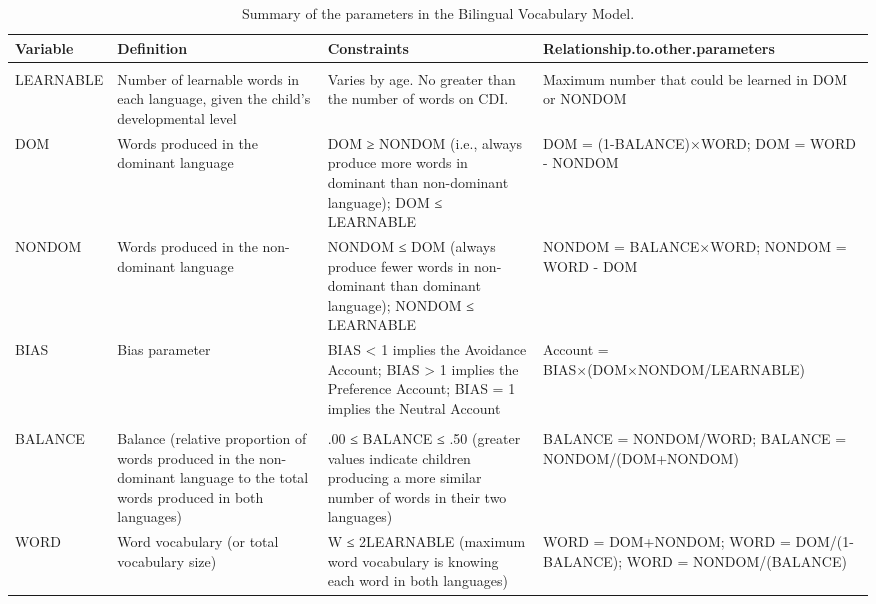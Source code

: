 \documentclass[
  english,
  ,man,floatsintext]{apa6}
\begin{document}
\begin{landscape}\begin{table}

\caption{\label{tab:table1}Summary of the parameters in the Bilingual Vocabulary Model.}
\centering
\fontsize{7}{9}\selectfont
\begin{tabular}[t]{l>{\raggedright\arraybackslash}p{175px}>{\raggedright\arraybackslash}p{175px}>{\raggedright\arraybackslash}p{175px}}
\toprule
Variable & Definition & Constraints & Relationship.to.other.parameters\\
\midrule
\addlinespace[0.3em]
\multicolumn{4}{l}{\textbf{Main Parameters}}\\
\hspace{1em}LEARNABLE & Number of learnable words in each language, given the child’s developmental level & Varies by age. No greater than the number of words on CDI. & Maximum number that could be learned in DOM or NONDOM\\
\hspace{1em}DOM & Words produced in the dominant language & DOM ≥ NONDOM (i.e., always produce more words in dominant than non-dominant language); DOM ≤ LEARNABLE & DOM = (1-BALANCE)×WORD; DOM = WORD - NONDOM\\
\hspace{1em}NONDOM & Words produced in the non-dominant language & NONDOM ≤ DOM (always produce fewer words in non-dominant than dominant language); NONDOM ≤ LEARNABLE & NONDOM = BALANCE×WORD; NONDOM = WORD - DOM\\
\hspace{1em}BIAS & Bias parameter & BIAS < 1 implies the Avoidance Account; BIAS > 1 implies the Preference Account; BIAS = 1 implies the Neutral Account & Account = BIAS×(DOM×NONDOM/LEARNABLE)\\
\addlinespace[0.3em]
\multicolumn{4}{l}{\textbf{Derived Parameters}}\\
\hspace{1em}BALANCE & Balance (relative proportion of words produced in the non-dominant language to the total words produced in both languages) & .00 ≤ BALANCE ≤ .50 (greater values indicate children producing a more similar number of words in their two languages) & BALANCE = NONDOM/WORD; BALANCE = NONDOM/(DOM+NONDOM)\\
\hspace{1em}WORD & Word vocabulary (or total vocabulary size) & W ≤ 2LEARNABLE (maximum word vocabulary is knowing each word in both languages) & WORD = DOM+NONDOM; WORD = DOM/(1-BALANCE); WORD = NONDOM/(BALANCE)\\

\end{tabular}
\end{table}
\end{landscape}
\end{document}
